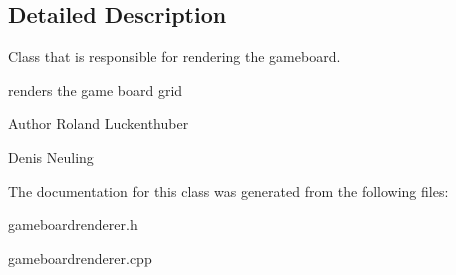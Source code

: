 \subsection{\-Detailed \-Description}
\-Class that is responsible for rendering the gameboard. 

renders the game board grid

\begin{DoxyAuthor}{\-Author}
\-Roland \-Luckenthuber 

\-Denis \-Neuling 
\end{DoxyAuthor}


\-The documentation for this class was generated from the following files\-:\begin{DoxyCompactItemize}
\item 
gameboardrenderer.\-h\item 
gameboardrenderer.\-cpp\end{DoxyCompactItemize}
